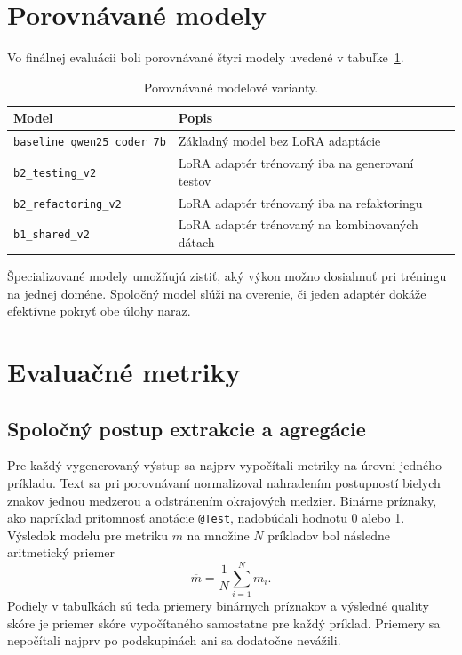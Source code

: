 \documentclass[11pt,a4paper]{article}
\newcommand{\modelbase}{\texttt{baseline\_qwen25\_coder\_7b}}
\newcommand{\modeltest}{\texttt{b2\_testing\_v2}}
\newcommand{\modelref}{\texttt{b2\_refactoring\_v2}}
\newcommand{\modelshared}{\texttt{b1\_shared\_v2}}
\begin{document}
\section{Porovnávané modely}

Vo finálnej evaluácii boli porovnávané štyri modely uvedené v tabuľke~\ref{tab:models}.

\begin{table}[h]
\centering
\begin{tabular}{ll}
\toprule
Model & Popis \\
\midrule
\modelbase & Základný model bez LoRA adaptácie \\
\modeltest & LoRA adaptér trénovaný iba na generovaní testov \\
\modelref & LoRA adaptér trénovaný iba na refaktoringu \\
\modelshared & LoRA adaptér trénovaný na kombinovaných dátach \\
\bottomrule
\end{tabular}
\caption{Porovnávané modelové varianty.}
\label{tab:models}
\end{table}

Špecializované modely umožňujú zistiť, aký výkon možno dosiahnuť pri tréningu na jednej doméne. Spoločný model slúži na overenie, či jeden adaptér dokáže efektívne pokryť obe úlohy naraz.

\section{Evaluačné metriky}

\subsection{Spoločný postup extrakcie a agregácie}

Pre každý vygenerovaný výstup sa najprv vypočítali metriky na úrovni jedného
príkladu. Text sa pri porovnávaní normalizoval nahradením postupností bielych
znakov jednou medzerou a odstránením okrajových medzier. Binárne príznaky, ako
napríklad prítomnosť anotácie \texttt{@Test}, nadobúdali hodnotu 0 alebo 1.
Výsledok modelu pre metriku $m$ na množine $N$ príkladov bol následne aritmetický
priemer
\begin{equation}
\overline{m} = \frac{1}{N}\sum_{i=1}^{N}m_i.
\end{equation}
Podiely v tabuľkách sú teda priemery binárnych príznakov a výsledné quality
skóre je priemer skóre vypočítaného samostatne pre každý príklad. Priemery sa
nepočítali najprv po podskupinách ani sa dodatočne nevážili.
\end{document}
